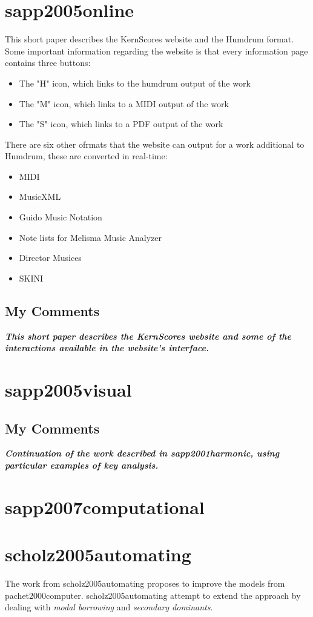 \section{sapp2005online }
  This short paper describes the KernScores website and the Humdrum format.
  Some important information regarding the website is that every information page contains three buttons:
  \begin{itemize}
    \item The "H" icon, which links to the humdrum output of the work
    \item The "M" icon, which links to a MIDI output of the work
    \item The "S" icon, which links to a PDF output of the work
  \end{itemize}
  There are six other ofrmats that the website can output for a work additional to Humdrum, these are converted in real-time:
  \begin{itemize}
    \item MIDI
    \item MusicXML
    \item Guido Music Notation
    \item Note lists for Melisma Music Analyzer
    \item Director Musices
    \item SKINI
  \end{itemize}
  \subsection{My Comments}
    \emph{\textbf{
      This short paper describes the KernScores website and some of the interactions available in the website's interface.
    }}
\section{sapp2005visual }
  \subsection{My Comments}
    \emph{\textbf{
      Continuation of the work described in sapp2001harmonic, using particular examples of key analysis.
    }}
\section{sapp2007computational }
\section{scholz2005automating }
  The work from scholz2005automating proposes to improve the models from pachet2000computer. scholz2005automating attempt to extend the approach by dealing with \emph{modal borrowing} and \emph{secondary dominants}.
